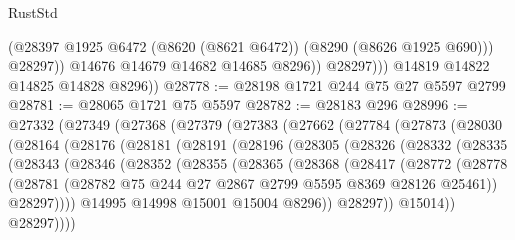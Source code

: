 \begin{lexlean}{RustStd}
\begin{coremodule}
                      (@28397 @1925 @6472 (@8620 (@8621 @6472)) (@8290 (@8626 @1925 @690)))
                      @28297))
                  @14676
                  @14679
                  @14682
                  @14685
                  @8296))
              @28297)))
        @14819
        @14822
        @14825
        @14828
        @8296))
@28778 := @28198 @1721 @244 @75 @27 @5597 @2799
@28781 := @28065 @1721 @75 @5597
@28782 := @28183 @296
@28996 := @27332
    (@27349
      (@27368
        (@27379
          (@27383
            (@27662
              (@27784
                (@27873
                  (@28030
                    (@28164
                      (@28176
                        (@28181
                          (@28191
                            (@28196
                              (@28305
                                (@28326
                                  (@28332
                                    (@28335
                                      (@28343
                                        (@28346
                                          (@28352
                                            (@28355
                                              (@28365
                                                (@28368
                                                  (@28417
                                                    (@28772
                                                      (@28778
                                                        (@28781
                                                          (@28782
                                                            @75
                                                            @244
                                                            @27
                                                            @2867
                                                            @2799
                                                            @5595
                                                            @8369
                                                            @28126
                                                            @25461))
                                                        @28297))))
                                                @14995
                                                @14998
                                                @15001
                                                @15004
                                                @8296))
                                            @28297))
                                        @15014))
                                    @28297))))

\end{coremodule}
\end{lexlean}
